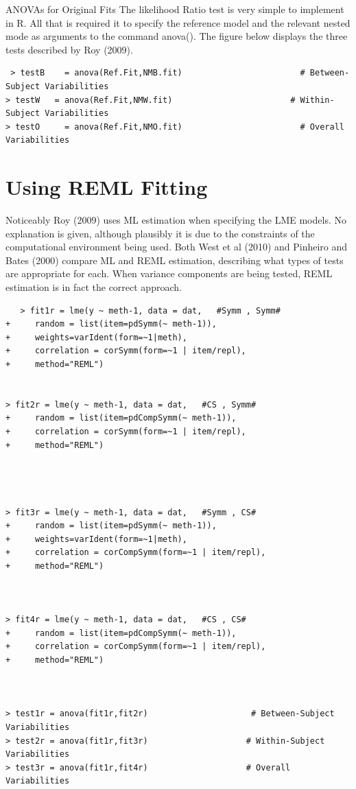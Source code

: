 \documentclass[12pt, a4paper]{report}
\theoremstyle{plain}
\theoremstyle{definition}
\theoremstyle{remark}
\begin{document}
ANOVAs  for  Original Fits
The likelihood Ratio test is very simple to implement in R. All that is required it to specify the reference model and the relevant nested mode as arguments to the command anova().
The figure below displays the three tests described by Roy (2009).
\begin{framed}
	\begin{verbatim}  
 > testB    = anova(Ref.Fit,NMB.fit)                        # Between-Subject Variabilities
> testW   = anova(Ref.Fit,NMW.fit)                        # Within-Subject Variabilities
> testO     = anova(Ref.Fit,NMO.fit)                        # Overall Variabilities
\end{verbatim}
\end{framed}
  
 


 


\section{Using REML Fitting}

Noticeably Roy (2009) uses ML estimation when specifying the LME models. No explanation is given, although plausibly it is due to the constraints of the computational environment being used.
Both West et al (2010) and Pinheiro and Bates (2000) compare ML and REML estimation, describing what types of tests are appropriate for each.  When variance components are being tested, REML estimation is in fact the correct approach.


\begin{framed}
	\begin{verbatim}   > fit1r = lme(y ~ meth-1, data = dat,   #Symm , Symm#
+     random = list(item=pdSymm(~ meth-1)), 
+     weights=varIdent(form=~1|meth),
+     correlation = corSymm(form=~1 | item/repl), 
+     method="REML")


> fit2r = lme(y ~ meth-1, data = dat,   #CS , Symm#
+     random = list(item=pdCompSymm(~ meth-1)),
+     correlation = corSymm(form=~1 | item/repl), 
+     method="REML")



  
> fit3r = lme(y ~ meth-1, data = dat,   #Symm , CS# 
+     random = list(item=pdSymm(~ meth-1)),
+     weights=varIdent(form=~1|meth), 
+     correlation = corCompSymm(form=~1 | item/repl), 
+     method="REML")



> fit4r = lme(y ~ meth-1, data = dat,   #CS , CS# 
+     random = list(item=pdCompSymm(~ meth-1)), 
+     correlation = corCompSymm(form=~1 | item/repl), 
+     method="REML")



> test1r = anova(fit1r,fit2r)                     # Between-Subject Variabilities
> test2r = anova(fit1r,fit3r)                    # Within-Subject Variabilities
> test3r = anova(fit1r,fit4r)                    # Overall Variabilities   

\end{verbatim}
\end{framed}
\end{document}
